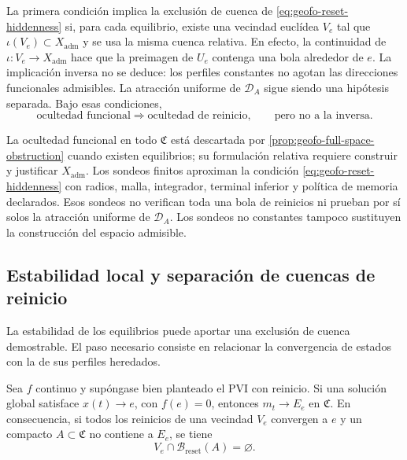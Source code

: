 La primera condición implica la exclusión de cuenca de
\cref{eq:geofo-reset-hiddenness} si, para cada equilibrio, existe una
vecindad euclídea \(V_e\) tal que \(\iota(V_e)\subset X_{\mathrm{adm}}\)
y se usa la misma cuenca relativa. En efecto, la continuidad de
\(\iota:V_e\to X_{\mathrm{adm}}\) hace que la preimagen de \(U_e\)
contenga una bola alrededor de \(e\). La implicación inversa no se deduce:
los perfiles constantes no agotan las direcciones funcionales admisibles.
La atracción uniforme de \(\mathcal D_A\) sigue siendo una hipótesis
separada. Bajo esas condiciones,
\begin{equation}
 \text{ocultedad funcional}
 \Longrightarrow
 \text{ocultedad de reinicio},
 \qquad
 \text{pero no a la inversa.}
 \label{eq:geofo-hiddenness-hierarchy}
\end{equation}



\begin{proposalbox}
La ocultedad funcional en todo \(\mathfrak C\) está descartada por
\cref{prop:geofo-full-space-obstruction} cuando existen equilibrios; su
formulación relativa requiere construir y justificar
\(X_{\mathrm{adm}}\). Los sondeos finitos aproximan la condición
\cref{eq:geofo-reset-hiddenness} con radios, malla, integrador, terminal
inferior y política de memoria declarados. Esos sondeos no verifican toda una
bola de reinicios ni prueban por sí solos la atracción uniforme de
\(\mathcal D_A\). Los sondeos no constantes tampoco sustituyen la
construcción del espacio admisible.
\end{proposalbox}

\subsection{Estabilidad local y separación de cuencas de reinicio}

La estabilidad de los equilibrios puede aportar una exclusión de cuenca
demostrable. El paso necesario consiste en relacionar la convergencia de
estados con la de sus perfiles heredados.

\begin{proposition}
\label{prop:geofo-reset-equilibrium-separation}
Sea \(f\) continuo y supóngase bien planteado el PVI con reinicio. Si una
solución global satisface \(x(t)\to e\), con \(f(e)=0\), entonces
\(m_t\to E_e\) en \(\mathfrak C\). En consecuencia, si todos los
reinicios de una vecindad \(V_e\) convergen a \(e\) y un compacto
\(A\subset\mathfrak C\) no contiene a \(E_e\), se tiene
\[
 V_e\cap\mathcal B_{\mathrm{reset}}(A)=\varnothing.
\]
\end{proposition}

